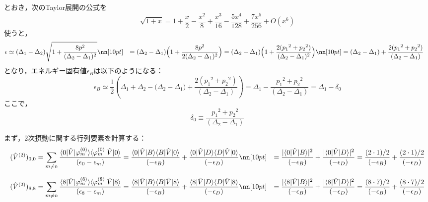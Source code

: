 とおき，次のTaylor展開の公式を
\begin{equation}
    \sqrt{1+x}
    =1+\frac{x}{2}-\frac{x^2}{8}+\frac{x^3}{16}-\frac{5x^4}{128}+\frac{7x^5}{256}+O\left(x^6\right)
\end{equation}
使うと，
\begin{align}
    \epsilon
    &\simeq{(\Delta_{1}}-\Delta_{2})
    \sqrt{1+\frac{8p^2}{(\Delta_{2}-\Delta_{1})^2}}\nn[10pt]
    &={(\Delta_{2}}-{\Delta_{1}})
    \Bigl(1+\frac{8p^2}{2(\Delta_{2}-\Delta_{1})^2}\Bigr)
    ={(\Delta_{2}}-{\Delta_{1}})
    \Bigl(1+\frac{2({p_{1}}^2+{p_{2}}^2)}{(\Delta_{2}-\Delta_{1})^2}\Bigr)\nn[10pt]
    &={(\Delta_{2}}-{\Delta_{1}})
    +\frac{2({p_{1}}^2+{p_{2}}^2)}{(\Delta_{2}-\Delta_{1})}
\end{align}
となり，エネルギー固有値$\epsilon_B$は以下のようになる：
\begin{equation}
    \epsilon_B
    \simeq\frac{1}{2}\left({\Delta_{1}}
    +{\Delta_{2}}-{(\Delta_{2}}-{\Delta_{1}})
    +\frac{2({p_{1}}^2+{p_{2}}^2)}{(\Delta_{2}-\Delta_{1})}\right)
    =\Delta_1 - \frac{{p_{1}}^2+{p_{2}}^2}{(\Delta_{2}-\Delta_{1})}
    =\Delta_1 - \delta_0
\end{equation}
ここで，
\begin{equation}
    \delta_0 \equiv \frac{{p_{1}}^2+{p_{2}}^2}{(\Delta_{2}-\Delta_{1})}
\end{equation}

まず，2次摂動に関する行列要素を計算する：
\begin{align}
    (\hat{V}^{(2)})_{0,0}
    &=\sum_{m\neq n}
    \frac{\langle{0|\hat{V}|\varphi^{(0)}_m}\rangle
    \langle{\varphi^{(0)}_{m}|\hat{V}|0}\rangle}
    {(\epsilon_0-\epsilon_m)}
    =
    \frac{\langle{0|\hat{V}|B}\rangle
    \langle{B|\hat{V}|0}\rangle}
    {(-\epsilon_B)}
    +\frac{\langle{0|\hat{V}|D}\rangle
    \langle{D|\hat{V}|0}\rangle}
    {(-\epsilon_D)}\nn[10pt]
    &=\frac{|\langle{0|\hat{V}|B}\rangle|^2}
    {(-\epsilon_B)}
    +\frac{|\langle{0|\hat{V}|D}\rangle|^2}
    {(-\epsilon_D)}
    =\frac{(2\cdot1)  / 2}
    {(-\epsilon_B)}
    +\frac{(2\cdot1)  / 2}
    {(-\epsilon_D)}
\end{align}


\begin{align}
    (\hat{V}^{(2)})_{8,8}
    &=\sum_{m\neq n}
    \frac{\langle{8|\hat{V}|\varphi^{(8)}_m}\rangle
    \langle{\varphi^{(8)}_{m}|\hat{V}|8}\rangle}
    {(\epsilon_8-\epsilon_m)}
    =
    \frac{\langle{8|\hat{V}|B}\rangle
    \langle{B|\hat{V}|8}\rangle}
    {(-\epsilon_B)}
    +\frac{\langle{8|\hat{V}|D}\rangle
    \langle{D|\hat{V}|8}\rangle}
    {(-\epsilon_D)}\nn[10pt]
    &=\frac{|\langle{8|\hat{V}|B}\rangle|^2}
    {(-\epsilon_B)}
    +\frac{|\langle{8|\hat{V}|D}\rangle|^2}
    {(-\epsilon_D)}
    =\frac{(8\cdot7) / 2}
    {(-\epsilon_B)}
    +\frac{(8\cdot7) / 2}
    {(-\epsilon_D)}
\end{align}




